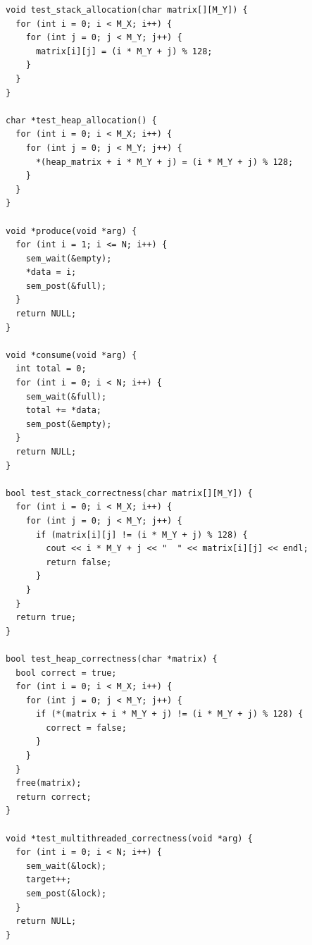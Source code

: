 \documentclass[bsc,frontabs,twoside,singlespacing,parskip,deptreport]{infthesis}     %
\begin{document}
\begin{lstlisting}[style=block]
void test_stack_allocation(char matrix[][M_Y]) {
  for (int i = 0; i < M_X; i++) {
    for (int j = 0; j < M_Y; j++) {
      matrix[i][j] = (i * M_Y + j) % 128;
    }
  }
}

char *test_heap_allocation() {
  for (int i = 0; i < M_X; i++) {
    for (int j = 0; j < M_Y; j++) {
      *(heap_matrix + i * M_Y + j) = (i * M_Y + j) % 128;
    }
  }
}

void *produce(void *arg) {
  for (int i = 1; i <= N; i++) {
    sem_wait(&empty);
    *data = i;
    sem_post(&full);
  }
  return NULL;
}

void *consume(void *arg) {
  int total = 0;
  for (int i = 0; i < N; i++) {
    sem_wait(&full);
    total += *data;
    sem_post(&empty);
  }
  return NULL;
}

bool test_stack_correctness(char matrix[][M_Y]) {
  for (int i = 0; i < M_X; i++) {
    for (int j = 0; j < M_Y; j++) {
      if (matrix[i][j] != (i * M_Y + j) % 128) {
        cout << i * M_Y + j << "  " << matrix[i][j] << endl;
        return false;
      }
    }
  }
  return true;
}

bool test_heap_correctness(char *matrix) {
  bool correct = true;
  for (int i = 0; i < M_X; i++) {
    for (int j = 0; j < M_Y; j++) {
      if (*(matrix + i * M_Y + j) != (i * M_Y + j) % 128) {
        correct = false;
      }
    }
  }
  free(matrix);
  return correct;
}

void *test_multithreaded_correctness(void *arg) {
  for (int i = 0; i < N; i++) {
    sem_wait(&lock);
    target++;
    sem_post(&lock);
  }
  return NULL;
}
\end{lstlisting}
\end{document}
